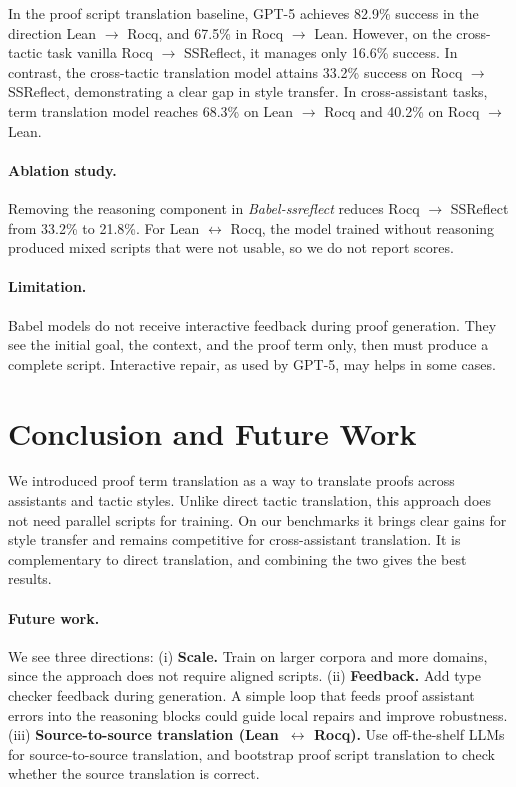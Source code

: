 \documentclass{article}
\begin{document}
In the proof script translation baseline, GPT-5 achieves 82.9\% success in the direction Lean $\to$ Rocq, and 67.5\% in Rocq $\to$ Lean. However, on the cross-tactic task vanilla Rocq $\to$ SSReflect, it manages only 16.6\% success.
%
In contrast, the cross-tactic translation model attains 33.2\% success on Rocq $\to$ SSReflect, demonstrating a clear gap in style transfer. In cross-assistant tasks, term translation model reaches 68.3\% on Lean $\to$ Rocq and 40.2\% on Rocq $\to$ Lean.

\paragraph*{Ablation study.}

Removing the reasoning component in \textit{Babel-ssreflect} reduces Rocq $\to$ SSReflect from 33.2\% to 21.8\%. For Lean $\leftrightarrow$ Rocq, the model trained without reasoning produced mixed scripts that were not usable, so we do not report scores.

\paragraph*{Limitation.}

Babel models do not receive interactive feedback during proof generation. They see the initial goal, the context, and the proof term only, then must produce a complete script. Interactive repair, as used by GPT-5, may helps in some cases.

\section{Conclusion and Future Work}

We introduced proof term translation as a way to translate proofs across assistants and tactic styles. Unlike direct tactic translation, this approach does not need parallel scripts for training. On our benchmarks it brings clear gains for style transfer and remains competitive for cross-assistant translation. It is complementary to direct translation, and combining the two gives the best results.

\paragraph{Future work.}
We see three directions:
%
(i) \textbf{Scale.} Train on larger corpora and more domains, since
the approach does not require aligned scripts.
%
(ii) \textbf{Feedback.} Add type checker feedback during generation. A
simple loop that feeds proof assistant errors into the reasoning
blocks could guide local repairs and improve robustness.
%
(iii) \textbf{Source-to-source translation (Lean~$\leftrightarrow$
  Rocq).} Use off-the-shelf LLMs for source-to-source translation, and
bootstrap proof script translation to check whether the source
translation is correct.
\end{document}

